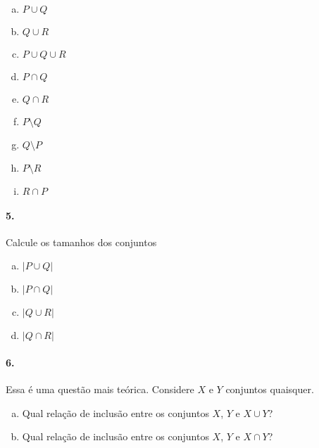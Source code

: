 \documentclass[a4paper,twocolumn,12pt]{article}
\begin{document}
\begin{minipage}[t]{0.45\columnwidth}
  \begin{enumerate}[a)]
    \item \(P\cup Q\)
    \item \(Q\cup R\)
    \item \(P\cup Q \cup R\)
    \item \(P\cap Q\)
    \item \(Q\cap R\)
  \end{enumerate}
\end{minipage}\begin{minipage}[t]{0.45\columnwidth}
  \begin{enumerate}[a)]
    \setcounter{enumi}{5}
    \item \(P\setminus Q\)
    \item \(Q\setminus P\)
    \item \(P\setminus R\)
    \item \(R\cap P\)
  \end{enumerate}
\end{minipage} 

\paragraph{5.} Calcule os tamanhos dos conjuntos
\begin{enumerate}[a)]
  \item \(|P\cup Q|\)
  \item \(|P\cap Q|\)
  \item \(|Q\cup R|\)
  \item \(|Q\cap R|\)
\end{enumerate}

\paragraph{6.} Essa é uma questão mais teórica. Considere $X$ e $Y$ conjuntos quaisquer. 
\begin{enumerate}[a)] 
\item Qual relação de inclusão entre os conjuntos \(X\), \(Y\) e \(X\cup Y\)?
\item Qual relação de inclusão entre os conjuntos \(X\), \(Y\) e \(X\cap Y\)?
\end{enumerate}

 

\vspace*{\fill}
\end{document}

